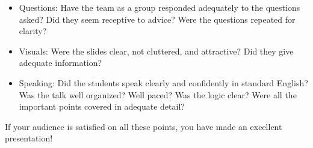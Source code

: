 \documentclass[12pt]{article}
\begin{document}
\begin{itemize}
\item Questions: Have the team as a group responded adequately to the
  questions asked? Did they seem receptive to advice? Were the
  questions repeated for clarity?

\item Visuals: Were the slides clear, not cluttered, and attractive?
  Did they give adequate information?

\item Speaking: Did the students speak clearly and confidently in
  standard English? Was the talk well organized? Well paced? Was the
  logic clear? Were all the important points covered in adequate
  detail?

\end{itemize}

If your audience is satisfied on all these points, you have made an excellent presentation!


\nocite{*}

\end{document}
